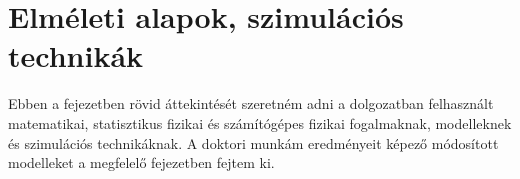\chapter{Elméleti alapok, szimulációs technikák}
\label{chapt:theoretical_intro}

\begin{comment}
Tehát a kövezezőkről van itt szó:
1.
Alklamazott statisztikus eloszlások és a Gamma függvény:
 - ami a cimben szerepel, ez igazából már kész is van

2. 
Törés és statisztikus fizika, vagy szilárd testek törésének statisztikus fizikai aspektusai
	Ezt valahogy a zoli a gábor a geri és a cikkek alapján kéne összeszedni. Majd meglátjuk mennyire lehet.
	-hatványfüggvények jelentősége 
	-fázisátalakulások
	-univerzalitás

3.
Törés modellezési lehetőségei:
 - egy kis bevezető miért érdekes a törés vizsgálata, habár az introduction is pont erről szól.
 - Fragmentáció:
 		Általános elméleti bevezető a fragmentációról, illetve néhány kép ami bemutat néhány
 		fragmentációs folyamatot. Esetleg ábra a hatványfüggvény eloszlásról, könyvből kell kivenni
 		megnézem majd Gábor dolgozatát. Továbbá kellenek még majd referenciák
 - FBM:
 	  A zoliéhoz hasonló bevezetése az általános modellnek. Példákat mutatva, kvázi irodalmat
 	  áttekintve vele, hogy mire is lehet még használni ezt a modellt.
 	  Ábrák:
 	  -LLS hatványfüggvény
 	  -GLS hatványfüggvény
 	  -Constitutive görbe
 	  
 	  Érdemes lenne még az FBM esetében fontos jellemzőkről beszélni:
 	  -lavina méret eloszlás
 	  -Állapot egyenlet, a megyúlás feszültés ábra
 	  -

4.
Szimulációs technikák 
	- Molekuláris dinamika:
		 Itt nyilván a módszer jellemzőit írom le, példát hozva a kölcsönhatásokra, de igazából nem kell
		 annyira belemenni a példákba, mert a későbbi fejezetben részletesen ismertetek egy modellt amit használtunk
		 
	- Szálköteg modell szimulációja
 
	-
\end{comment}

Ebben a fejezetben rövid áttekintését szeretném adni a dolgozatban felhasznált matematikai, statisztikus fizikai és számítógépes fizikai fogalmaknak, modelleknek és szimulációs technikáknak.
A doktori munkám eredményeit képező módosított modelleket a megfelelő fejezetben fejtem ki.


